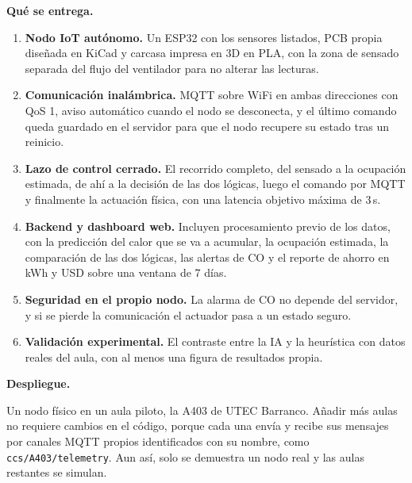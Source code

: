 \documentclass[10pt,a4paper]{article}
\newcommand{\subhead}[1]{\vspace{6pt}\textbf{#1}\par\vspace{0pt}}
\begin{document}
\subhead{Qué se entrega.}
\begin{enumerate}[leftmargin=1.4em,itemsep=1.5pt,topsep=2pt,parsep=0pt]
  \item \textbf{Nodo IoT autónomo.} Un ESP32 con los sensores listados, PCB propia diseñada
  en KiCad y carcasa impresa en 3D en PLA, con la zona de sensado separada del flujo del
  ventilador para no alterar las lecturas.
  \item \textbf{Comunicación inalámbrica.} MQTT sobre WiFi en ambas direcciones con QoS 1,
  aviso automático cuando el nodo se desconecta, y el último comando queda guardado en el
  servidor para que el nodo recupere su estado tras un reinicio.
  \item \textbf{Lazo de control cerrado.} El recorrido completo, del sensado a la ocupación
  estimada, de ahí a la decisión de las dos lógicas, luego el comando por MQTT y finalmente
  la actuación física, con una latencia objetivo máxima de 3\,s.
  \item \textbf{Backend y dashboard web.} Incluyen procesamiento previo de los datos, con la
  predicción del calor que se va a acumular, la ocupación estimada, la comparación de las
  dos lógicas,
  las alertas de CO y el reporte de ahorro en kWh y USD sobre una ventana de 7 días.
  \item \textbf{Seguridad en el propio nodo.} La alarma de CO no depende del servidor, y si
  se pierde la comunicación el actuador pasa a un estado seguro.
  \item \textbf{Validación experimental.} El contraste entre la IA y la heurística con datos
  reales del aula, con al menos una figura de resultados propia.
\end{enumerate}

\subhead{Despliegue.}
Un nodo físico en un aula piloto, la A403 de UTEC Barranco. Añadir más aulas no requiere
cambios en el código, porque cada una envía y recibe sus mensajes por canales MQTT propios
identificados con su nombre, como \texttt{ccs/A403/telemetry}. Aun así, solo se demuestra un
nodo real y las aulas restantes se simulan.
\end{document}
